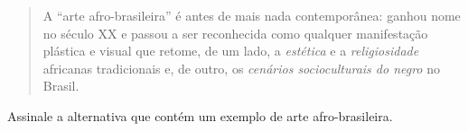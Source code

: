 \begin{escolha}
\begin{quote}
A ``arte afro-brasileira'' é antes de mais nada contemporânea: ganhou
nome no século XX e passou a ser reconhecida como qualquer manifestação
plástica e visual que retome, de um lado, a \emph{estética} e
a \emph{religiosidade} africanas tradicionais e, de outro,
os \emph{cenários socioculturais do negro} no Brasil.

\end{quote}

Assinale a alternativa que contém um exemplo de arte afro-brasileira.

%
%
%
%
%
%
%
%
%
%


\end{escolha}
